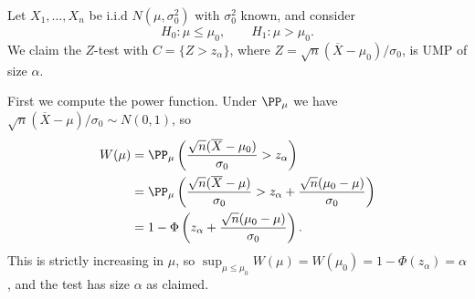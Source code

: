 \begin{example}
  Let $X_1, \dots, X_n$ be i.i.d $N(\mu, \sigma_0^2)$ with $\sigma_0^2$ known, and consider
  $$
  H_0 : \mu \leq \mu_0, \qquad H_1 : \mu > \mu_0.
  $$
  We claim the $Z$-test with $C = \{Z > z_\alpha\}$, where $Z = \sqrt{n}(\overline{X}-\mu_0)/\sigma_0$, is UMP of size $\alpha$.

  First we compute the power function. Under $\PP_\mu$ we have $\sqrt{n}(\overline{X}-\mu)/\sigma_0 \sim N(0,1)$, so
  \begin{align*}
    W(\mu) &= \PP_\mu\left(\frac{\sqrt{n}(\overline{X}-\mu_0)}{\sigma_0} > z_\alpha\right)\\
    &= \PP_\mu\left(\frac{\sqrt{n}(\overline{X}-\mu)}{\sigma_0} > z_\alpha + \frac{\sqrt{n}(\mu_0 - \mu)}{\sigma_0}\right)\\
    &= 1 - \Phi\left(z_\alpha + \frac{\sqrt{n}(\mu_0-\mu)}{\sigma_0}\right).
  \end{align*}
  This is strictly increasing in $\mu$, so $\sup_{\mu\leq\mu_0}W(\mu) = W(\mu_0) = 1 - \Phi(z_\alpha) = \alpha$, and the test has size $\alpha$ as claimed.


\end{example}
